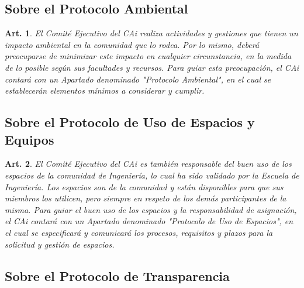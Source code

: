 \documentclass[letterpaper,11pt]{article}
\theoremstyle{plain}
\newtheorem{art}{Art.} %
\begin{document}
		\subsection*{Sobre el Protocolo Ambiental}

			\begin{art}\label{definicionProtocoloAmbiental}
				El Comité Ejecutivo del CAi realiza actividades y gestiones que tienen un impacto ambiental en la comunidad que lo rodea. Por lo mismo, deberá preocuparse de minimizar este impacto en cualquier circunstancia, en la medida de lo posible según sus facultades y recursos. Para guiar esta preocupación, el CAi contará con un Apartado denominado "Protocolo Ambiental", en el cual se establecerán elementos mínimos a considerar y cumplir.
			\end{art}

		\subsection*{Sobre el Protocolo de Uso de Espacios y Equipos}

			\begin{art}\label{definicionProtocoloEspacios}
				El Comité Ejecutivo del CAi es también responsable del buen uso de los espacios de la comunidad de Ingeniería, lo cual ha sido validado por la Escuela de Ingeniería. Los espacios son de la comunidad y están disponibles para que sus miembros los utilicen, pero siempre en respeto de los demás participantes de la misma. Para guiar el buen uso de los espacios y la responsabilidad de asignación, el CAi contará con un Apartado denominado "Protocolo de Uso de Espacios", en el cual se especificará y comunicará los procesos, requisitos y plazos para la solicitud y gestión de espacios.
			\end{art}

		\subsection*{Sobre el Protocolo de Transparencia}
\end{document}
